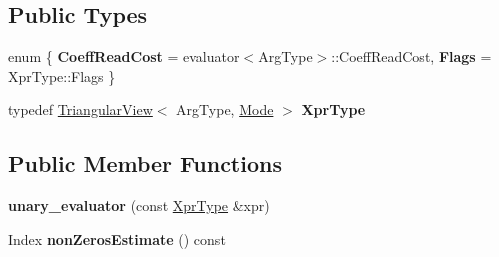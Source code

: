 \subsection*{Public Types}
\begin{DoxyCompactItemize}
\item 
\mbox{\label{struct_eigen_1_1internal_1_1unary__evaluator_3_01_triangular_view_3_01_arg_type_00_01_mode_01_4_00_01_iterator_based_01_4_a96991c17288c27466849ad5e4c003d6e}} 
enum \{ {\bfseries Coeff\+Read\+Cost} = evaluator$<$Arg\+Type$>$\+::Coeff\+Read\+Cost, 
{\bfseries Flags} = Xpr\+Type\+::Flags
 \}
\item 
\mbox{\label{struct_eigen_1_1internal_1_1unary__evaluator_3_01_triangular_view_3_01_arg_type_00_01_mode_01_4_00_01_iterator_based_01_4_a48f8fbca92bc9115bc1d1cb5b7a228a1}} 
typedef \mbox{\hyperlink{class_eigen_1_1_triangular_view}{Triangular\+View}}$<$ Arg\+Type, \mbox{\hyperlink{struct_mode}{Mode}} $>$ {\bfseries Xpr\+Type}
\end{DoxyCompactItemize}
\subsection*{Public Member Functions}
\begin{DoxyCompactItemize}
\item 
\mbox{\label{struct_eigen_1_1internal_1_1unary__evaluator_3_01_triangular_view_3_01_arg_type_00_01_mode_01_4_00_01_iterator_based_01_4_ad8850529525bdd91460d3b6194fcdcd3}} 
{\bfseries unary\+\_\+evaluator} (const \mbox{\hyperlink{class_eigen_1_1_triangular_view}{Xpr\+Type}} \&xpr)
\item 
\mbox{\label{struct_eigen_1_1internal_1_1unary__evaluator_3_01_triangular_view_3_01_arg_type_00_01_mode_01_4_00_01_iterator_based_01_4_a602922bdf94b794fa5acacadf191ff55}} 
Index {\bfseries non\+Zeros\+Estimate} () const
\end{DoxyCompactItemize}
